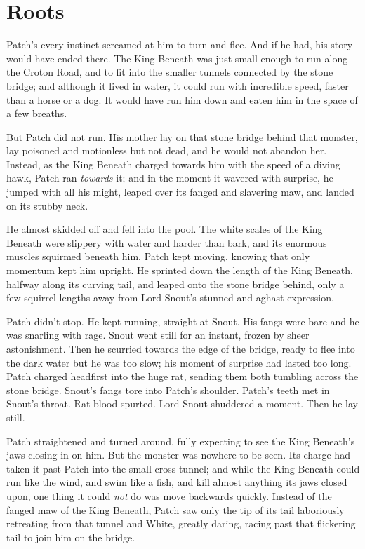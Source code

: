 \documentclass[12pt]{book}
\begin{document}

\section{Roots}

Patch's every instinct screamed at him to turn and flee. And if he had, his story would have ended there. The King Beneath was just small enough to run along the Croton Road, and to fit into the smaller tunnels connected by the stone bridge; and although it lived in water, it could run with incredible speed, faster than a horse or a dog. It would have run him down and eaten him in the space of a few breaths.

But Patch did not run. His mother lay on that stone bridge behind that monster, lay poisoned and motionless but not dead, and he would not abandon her. Instead, as the King Beneath charged towards him with the speed of a diving hawk, Patch ran {\it towards} it; and in the moment it wavered with surprise, he jumped with all his might, leaped over its fanged and slavering maw, and landed on its stubby neck.

He almost skidded off and fell into the pool. The white scales of the King Beneath were slippery with water and harder than bark, and its enormous muscles squirmed beneath him. Patch kept moving, knowing that only momentum kept him upright. He sprinted down the length of the King Beneath, halfway along its curving tail, and leaped onto the stone bridge behind, only a few squirrel-lengths away from Lord Snout's stunned and aghast expression.

Patch didn't stop. He kept running, straight at Snout. His fangs were bare and he was snarling with rage. Snout went still for an instant, frozen by sheer astonishment. Then he scurried towards the edge of the bridge, ready to flee into the dark water %
but he was too slow; his moment of surprise had lasted too long. Patch charged headfirst into the huge rat, sending them both tumbling across the stone bridge. Snout's fangs tore into Patch's shoulder. Patch's teeth met in Snout's throat. Rat-blood spurted. Lord Snout shuddered a moment. Then he lay still.

Patch straightened and turned around, fully expecting to see the King Beneath's jaws closing in on him. But the monster was nowhere to be seen. Its charge had taken it past Patch into the small cross-tunnel; and while the King Beneath could run like the wind, and swim like a fish, and kill almost anything its jaws closed upon, one thing it could {\it not} do was move backwards quickly. Instead of the fanged maw of the King Beneath, Patch saw only the tip of its tail laboriously retreating from that tunnel %
and White, greatly daring, racing past that flickering tail to join him on the bridge.
\end{document}
